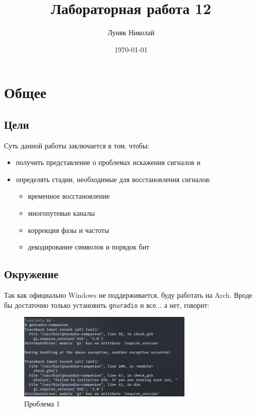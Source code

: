 \documentclass[a4paper,12pt]{report}
\author{Луняк Николай}
\title{Лабораторная работа 12}
\date{\today}
\begin{document}
    \maketitle
    \tableofcontents
    \listoffigures
    \lstlistoflistings
    
    \chapter{Общее}
    \section{Цели}
    
    Суть данной работы заключается в том, чтобы:
    
    \begin{itemize}
        \item получить представление о проблемах искажения сигналов и 
        
        \item определять стадии, необходимые для восстановления сигналов:
        \begin{itemize}
            \item временное восстановление
            \item многопутевые каналы
            \item коррекция фазы и частоты
            \item декодирование символов и порядок бит
        \end{itemize}
    \end{itemize}
    
    \section{Окружение}
    
    Так как официально Windows не поддерживается, буду работать на Arch. Вроде бы достаточно только установить \texttt{gnuradio} и все... а нет, говорит:
    
    \begin{figure}[H]
        \centering
        \includegraphics[width=0.75\textwidth]{images/error_1.png}
        \caption{Проблема 1}
        \label{fig:error_1}
    \end{figure}
    
\end{document}
